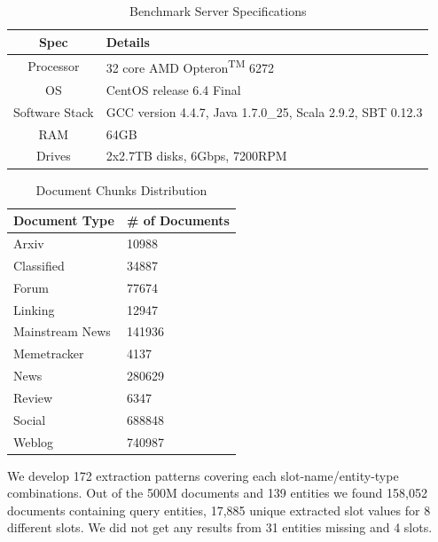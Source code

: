 \documentclass[letterpaper]{article}
\begin{document}
\begin{table}
\caption{Benchmark Server Specifications}
\centering
\label{table:serverspec}
\begin{tabular}{| c | p{4.8cm} |}
\hline 
\textbf{Spec} & \textbf{Details} \\ \hline
Processor & 32 core AMD Opteron\textsuperscript{TM} 6272 \\ \hline 
OS & CentOS release 6.4 Final \\ \hline 
Software Stack & GCC version 4.4.7, Java 1.7.0\_25, Scala 2.9.2, SBT 0.12.3 \\ \hline 
 RAM & 64GB\\ \hline 
 Drives & 2x2.7TB disks, 6Gbps, 7200RPM\\ \hline 
\end{tabular} 
\end{table}
 
\begin{table}
\caption{Document Chunks Distribution }
\centering
\label{table:documentsDist}

\begin{tabular}{|p{3.8cm}|p{3cm}|}
\hline 
\textbf{Document Type} & \textbf{\# of Documents}\\ 
\hline 
Arxiv & 10988  \\ \hline
 Classified & 34887  \\ \hline
 Forum & 77674  \\ \hline
 Linking & 12947  \\ \hline
 Mainstream News & 141936  \\ \hline
 Memetracker & 4137  \\ \hline
 News & 280629  \\ \hline
 Review & 6347 \\ \hline
 Social & 688848 \\ \hline
 Weblog & 740987  \\ \hline
\end{tabular} 
\end{table}


 
 
 
We develop 172 extraction patterns covering each slot-name/entity-type combinations.
Out of the 500M documents and 139 entities we found 158,052 documents containing query entities, 17,885 unique extracted slot values for 8 different slots.
We did not get any results from 31 entities missing and 4 slots.
\end{document}
